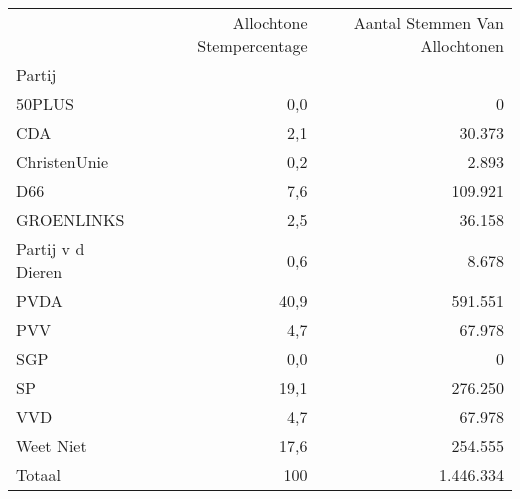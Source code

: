 \begin{tabular}{lrr}
\toprule
 &  Allochtone Stempercentage  &  Aantal Stemmen Van Allochtonen \\
Partij                &                        &                                 \\
\midrule
50PLUS                &                 0,0 &                               0 \\
CDA                   &                 2,1 &                           30.373 \\
ChristenUnie          &                 0,2 &                            2.893 \\
D66                   &                 7,6 &                          109.921 \\
GROENLINKS            &                 2,5 &                           36.158 \\
Partij v d Dieren &                 0,6 &                            8.678 \\
PVDA                  &                40,9 &                          591.551 \\
PVV                   &                4,7 &                           67.978 \\
SGP                   &                 0,0 &                               0 \\
SP                    &                19,1 &                          276.250 \\
VVD                   &                4,7 &                           67.978 \\
Weet Niet		      & 				17,6 & 						254.555 \\
\midrule
Totaal				&					100	&						1.446.334\\
\bottomrule
\end{tabular}
